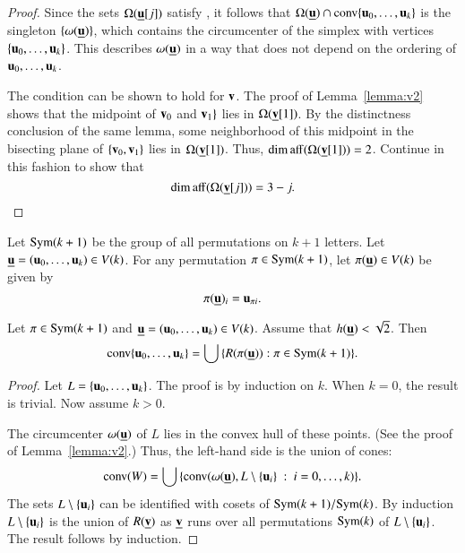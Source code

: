 \begin{proof} 
Since the sets $\Omega({\underline{{\mathbf u}}}[j])$ satisfy , it follows that
$\Omega({\underline{{\mathbf u}}})\cap {\operatorname{conv}}\{ {\mathbf u}_0,\ldots, {\mathbf u}_k\}$ is the singleton $\{\omega({\underline{{\mathbf u}}})\}$, which contains the
circumcenter of the simplex with vertices $\{ {\mathbf u}_0,\ldots, {\mathbf u}_k\}$.  This describes $\omega({\underline{{\mathbf u}}})$ in a way that does not depend on the ordering of $ {\mathbf u}_0,\ldots, {\mathbf u}_k$.

The condition  can be shown to hold for ${\mathbf v}$.
The proof of Lemma~\ref{lemma:v2} shows that the midpoint of ${\mathbf v}_0$ and ${\mathbf v}_1\}$
lies in $\Omega({\underline{{\mathbf v}}}[1])$.  By the distinctness conclusion of the same lemma, some neighborhood
of this midpoint in the bisecting plane of $\{{\mathbf v}_0,{\mathbf v}_1\}$ lies in $\Omega({\underline{{\mathbf v}}}[1])$.
Thus, $\operatorname{dim\,aff}(\Omega({\underline{{\mathbf v}}}[1]))=2$.  Continue in this fashion to show that 
\begin{displaymath}
\operatorname{dim\,aff}(\Omega({\underline{{\mathbf v}}}[j]))=3-j.\end{displaymath}
\end{proof}

Let
${\operatorname{Sym}}(k+1)$ be the group of all permutations on $k+1$ letters.
Let ${\underline{{\mathbf u}}} = ( {\mathbf u}_0,\ldots, {\mathbf u}_k)\in V(k)$.  
For any permutation $\pi\in{\operatorname{Sym}}(k+1)$, let $\pi({\underline{{\mathbf u}}})\in V(k)$ be given by
\begin{displaymath}
\pi({\underline{{\mathbf u}}})_i =  {\mathbf u}_{\pi i}.
\end{displaymath}   

\begin{lemma}\label{lemma:Rconv}  Let $\pi\in{\operatorname{Sym}}(k+1)$
and ${\underline{{\mathbf u}}} = ( {\mathbf u}_0,\ldots, {\mathbf u}_k)\in V(k)$.  
Assume that $h({\underline{{\mathbf u}}})<\sqrt2$. Then
\begin{displaymath}
{\operatorname{conv}}\{ {\mathbf u}_0,\ldots, {\mathbf u}_k\} = \bigcup \,\{ R(\pi({\underline{{\mathbf u}}})) : \pi\in {\operatorname{Sym}}(k+1)\}.
\end{displaymath}
\end{lemma}
%

\begin{proof} Let $L = \{ {\mathbf u}_0,\ldots, {\mathbf u}_k\}$.  The proof is by induction on $k$.
When $k=0$, the result is trivial.  Now assume $k>0$.

The circumcenter $\omega({\underline{{\mathbf u}}})$ of $L$ lies in the convex hull of these
points.  (See the proof of Lemma~\ref{lemma:v2}.)  Thus, the left-hand side is the union
of cones:
\begin{displaymath}
{\operatorname{conv}}(W) = \bigcup\,\{ {\operatorname{conv}}(\omega({\underline{{\mathbf u}}}),L\setminus \{ {\mathbf u}_i\}\ :\  i=0,\ldots,k) \}.
\end{displaymath}
The sets $L\setminus \{ {\mathbf u}_i\}$ can be identified with  cosets of ${\operatorname{Sym}}(k+1) /{\operatorname{Sym}}(k)$.
By induction $L\setminus \{ {\mathbf u}_i\}$ is the union of $R({\underline{{\mathbf v}}})$ as ${\underline{{\mathbf v}}}$ runs
over all permutations ${\operatorname{Sym}}(k)$ of $L\setminus \{ {\mathbf u}_i\}$.
The result follows by induction.
\end{proof}

